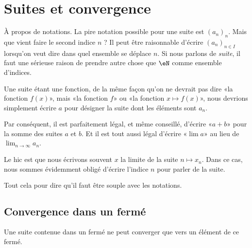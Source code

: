 \section{Suites et convergence}

\begin{normaltext}
    À propos de notations. La pire notation possible pour une suite est \( (a_n)_n\). Mais que vient faire le second indice \( n\) ? Il peut être raisonnable d'écrire \( (a_n)_{n\in I}\) lorsqu'on veut dire dans quel ensemble se déplace \( n\). Si nous parlons de \emph{suite}, il faut une sérieuse raison de prendre autre chose que \( \eN\) comme ensemble d'indices.

    Une suite étant une fonction, de la même façon qu'on ne devrait pas dire «la fonction \( f(x)\)», mais «la fonction \( f\)» ou «la fonction \( x\mapsto f(x)\)», nous devrions simplement écrire \( a\) pour désigner la suite dont les éléments sont \( a_n\). 

    Par conséquent, il est parfaitement légal, et même conseillé, d'écrire «\( a+b\)» pour la somme des suites \( a\) et \( b\). Et il est tout aussi légal d'écrire «\( \lim a\)» au lieu de \( \lim_{n\to \infty} a_n\).

    Le hic est que nous écrivons souvent \( x\) la limite de la suite \( n\mapsto x_n\). Dans ce cas, nous sommes évidemment obligé d'écrire l'indice \( n\) pour parler de la suite.

    Tout cela pour dire qu'il faut être souple avec les notations.
\end{normaltext}

\subsection{Convergence dans un fermé}

\begin{proposition}      \label{PROPooBBNSooCjrtRb}
    Une suite contenue dans un fermé ne peut converger que vers un élément de ce fermé.
\end{proposition}

